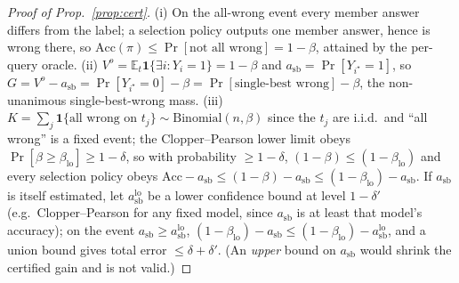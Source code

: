 \documentclass[11pt]{article}
\theoremstyle{plain}
\theoremstyle{definition}
\newcommand{\E}{\mathbb{E}}
\begin{document}
\begin{proof}[Proof of Prop.~\ref{prop:cert}]
(i) On the all-wrong event every member answer differs from the label; a selection policy outputs one member answer, hence is
wrong there, so $\mathrm{Acc}(\pi)\le\Pr[\text{not all wrong}]=1-\beta$, attained by the per-query oracle. (ii)
$V^o=\E_t\mathbf 1\{\exists i:Y_i{=}1\}=1-\beta$ and $a_{\mathrm{sb}}=\Pr[Y_{i^\star}{=}1]$, so
$G=V^o-a_{\mathrm{sb}}=\Pr[Y_{i^\star}{=}0]-\beta=\Pr[\text{single-best wrong}]-\beta$, the non-unanimous single-best-wrong mass.
(iii) $K=\sum_j\mathbf 1\{\text{all wrong on }t_j\}\sim\mathrm{Binomial}(n,\beta)$ since the $t_j$ are i.i.d.\ and ``all wrong''
is a fixed event; the Clopper--Pearson lower limit obeys $\Pr[\beta\ge\beta_{\mathrm{lo}}]\ge1-\delta$, so with probability
$\ge1-\delta$, $(1-\beta)\le(1-\beta_{\mathrm{lo}})$ and every selection policy obeys
$\mathrm{Acc}-a_{\mathrm{sb}}\le(1-\beta)-a_{\mathrm{sb}}\le(1-\beta_{\mathrm{lo}})-a_{\mathrm{sb}}$. If $a_{\mathrm{sb}}$ is itself
estimated, let $a_{\mathrm{sb}}^{\mathrm{lo}}$ be a lower confidence bound at level $1-\delta'$ (e.g.\ Clopper--Pearson for any fixed
model, since $a_{\mathrm{sb}}$ is at least that model's accuracy); on the event $a_{\mathrm{sb}}\ge a_{\mathrm{sb}}^{\mathrm{lo}}$,
$(1-\beta_{\mathrm{lo}})-a_{\mathrm{sb}}\le(1-\beta_{\mathrm{lo}})-a_{\mathrm{sb}}^{\mathrm{lo}}$, and a union bound gives total error
$\le\delta+\delta'$. (An \emph{upper} bound on $a_{\mathrm{sb}}$ would shrink the certified gain and is not valid.)
\end{proof}
\end{document}
